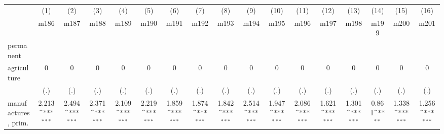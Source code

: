 {
\def\sym#1{\ifmmode^{#1}\else\(^{#1}\)\fi}
\begin{tabular}{l*{16}{c}}
\hline\hline
                    &\multicolumn{1}{c}{(1)}&\multicolumn{1}{c}{(2)}&\multicolumn{1}{c}{(3)}&\multicolumn{1}{c}{(4)}&\multicolumn{1}{c}{(5)}&\multicolumn{1}{c}{(6)}&\multicolumn{1}{c}{(7)}&\multicolumn{1}{c}{(8)}&\multicolumn{1}{c}{(9)}&\multicolumn{1}{c}{(10)}&\multicolumn{1}{c}{(11)}&\multicolumn{1}{c}{(12)}&\multicolumn{1}{c}{(13)}&\multicolumn{1}{c}{(14)}&\multicolumn{1}{c}{(15)}&\multicolumn{1}{c}{(16)}\\
                    &\multicolumn{1}{c}{m186}&\multicolumn{1}{c}{m187}&\multicolumn{1}{c}{m188}&\multicolumn{1}{c}{m189}&\multicolumn{1}{c}{m190}&\multicolumn{1}{c}{m191}&\multicolumn{1}{c}{m192}&\multicolumn{1}{c}{m193}&\multicolumn{1}{c}{m194}&\multicolumn{1}{c}{m195}&\multicolumn{1}{c}{m196}&\multicolumn{1}{c}{m197}&\multicolumn{1}{c}{m198}&\multicolumn{1}{c}{m199}&\multicolumn{1}{c}{m200}&\multicolumn{1}{c}{m201}\\
\hline
permanent           &                     &                     &                     &                     &                     &                     &                     &                     &                     &                     &                     &                     &                     &                     &                     &                     \\
agriculture         &           0         &           0         &           0         &           0         &           0         &           0         &           0         &           0         &           0         &           0         &           0         &           0         &           0         &           0         &           0         &           0         \\
                    &         (.)         &         (.)         &         (.)         &         (.)         &         (.)         &         (.)         &         (.)         &         (.)         &         (.)         &         (.)         &         (.)         &         (.)         &         (.)         &         (.)         &         (.)         &         (.)         \\
[1em]
manufactures, prim. &       2.213\sym{***}&       2.494\sym{***}&       2.371\sym{***}&       2.109\sym{***}&       2.219\sym{***}&       1.859\sym{***}&       1.874\sym{***}&       1.842\sym{***}&       2.514\sym{***}&       1.947\sym{***}&       2.086\sym{***}&       1.621\sym{***}&       1.301\sym{***}&       0.861\sym{**} &       1.338\sym{***}&       1.256\sym{***}\\

\end{tabular}}
